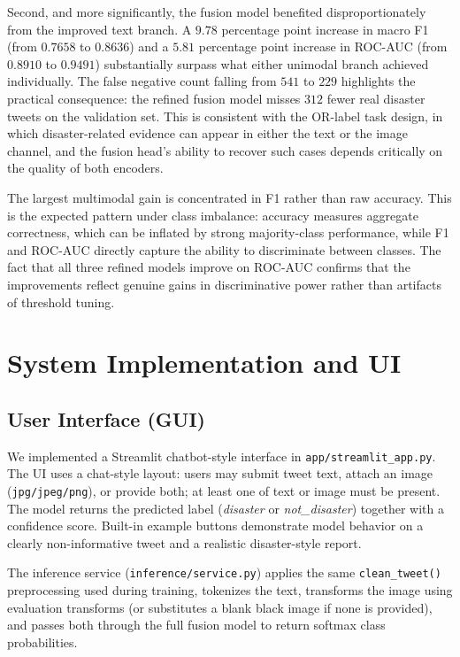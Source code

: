 \documentclass[11pt,letterpaper]{article}
\begin{document}
Second, and more significantly, the fusion model benefited disproportionately from the improved text branch. A $9.78$ percentage point increase in macro F1 (from $0.7658$ to $0.8636$) and a $5.81$ percentage point increase in ROC-AUC (from $0.8910$ to $0.9491$) substantially surpass what either unimodal branch achieved individually. The false negative count falling from $541$ to $229$ highlights the practical consequence: the refined fusion model misses $312$ fewer real disaster tweets on the validation set. This is consistent with the OR-label task design, in which disaster-related evidence can appear in either the text or the image channel, and the fusion head's ability to recover such cases depends critically on the quality of both encoders.

The largest multimodal gain is concentrated in F1 rather than raw accuracy. This is the expected pattern under class imbalance: accuracy measures aggregate correctness, which can be inflated by strong majority-class performance, while F1 and ROC-AUC directly capture the ability to discriminate between classes. The fact that all three refined models improve on ROC-AUC confirms that the improvements reflect genuine gains in discriminative power rather than artifacts of threshold tuning.


\section{System Implementation and UI}
\subsection{User Interface (GUI)}
We implemented a Streamlit chatbot-style interface in \texttt{app/streamlit\_app.py}. The UI uses a chat-style layout: users may submit tweet text, attach an image (\texttt{jpg/jpeg/png}), or provide both; at least one of text or image must be present. The model returns the predicted label (\textit{disaster} or \textit{not\_disaster}) together with a confidence score. Built-in example buttons demonstrate model behavior on a clearly non-informative tweet and a realistic disaster-style report.

The inference service (\texttt{inference/service.py}) applies the same \texttt{clean\_tweet()} preprocessing used during training, tokenizes the text, transforms the image using evaluation transforms (or substitutes a blank black image if none is provided), and passes both through the full fusion model to return softmax class probabilities.
\end{document}
